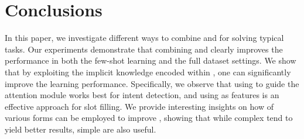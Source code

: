 \section{Conclusions}
In this paper, we investigate different ways to combine \NNs and \REs for solving typical \SLU tasks. Our experiments demonstrate that
combining \NNs and \REs clearly improves the \NN performance in both the few-shot learning and the  full dataset settings. We show that by
exploiting the implicit knowledge encoded within \REs, one can significantly improve the learning performance. Specifically, we observe
that using \REs to guide the attention module works best for intent detection, and using \REtags as features is an effective approach for
slot filling. We provide interesting insights on how \REs of various forms can be employed to improve \NNs, showing that while complex \REs
tend to yield better results, simple \REs are also useful.
